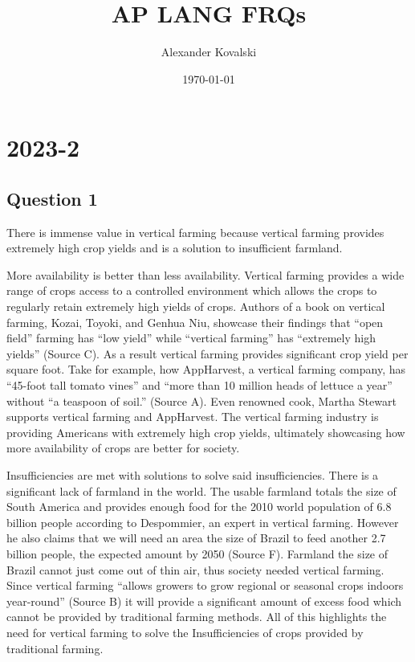 \documentclass[10pt]{article}
\title{AP LANG FRQs}
\author{Alexander Kovalski}
\date{\today}
\begin{document}
\maketitle

\begin{abstract}
\end{abstract}

\tableofcontents

%
\section{2023-2}
\subsection{Question 1}

There is immense value in vertical farming because vertical farming provides extremely high crop yields and is a solution to insufficient farmland.

More availability is better than less availability. Vertical farming provides a wide range of crops access to a controlled environment which allows the crops to regularly retain extremely high yields of crops. Authors of a book on vertical farming, Kozai, Toyoki, and Genhua Niu, showcase their findings that “open field” farming has “low yield” while “vertical farming” has “extremely high yields” (Source C). As a result vertical farming provides significant crop yield per square foot. Take for example, how AppHarvest, a vertical farming company, has “45-foot tall tomato vines” and “more than 10 million heads of lettuce a year” without “a teaspoon of soil.” (Source A). Even renowned cook, Martha Stewart supports vertical farming and AppHarvest. The vertical farming industry is providing Americans with extremely high crop yields, ultimately showcasing how more availability of crops are better for society.

Insufficiencies are met with solutions to solve said insufficiencies. There is a significant lack of farmland in the world. The usable farmland totals the size of South America and provides enough food for the 2010 world population of 6.8 billion people according to Despommier, an expert in vertical farming. However he also claims that we will need an area the size of Brazil to feed another 2.7 billion people, the expected amount by 2050 (Source F). Farmland the size of Brazil cannot just come out of thin air, thus society needed vertical farming. Since vertical farming “allows growers to grow regional or seasonal crops indoors year-round” (Source B) it will provide a significant amount of excess food which cannot be provided by traditional farming methods. All of this highlights the need for vertical farming to solve the Insufficiencies of crops provided by traditional farming.
\end{document}
